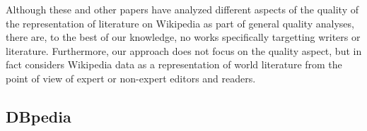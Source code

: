 \documentclass[a4paper,12pt]{scrartcl}
\begin{document}
Although these and %
other papers have analyzed different aspects of the quality of the
representation of literature on Wikipedia as part of
general %
quality analyses, there are, to the best of our knowledge, no works
specifically targetting writers or literature. Furthermore,
our approach does not focus on the quality aspect, but in fact
considers Wikipedia data as a representation of world literature
from the point of view of expert or non-expert editors and readers.



\subsection{DBpedia}\label{sec:dbpedia}
\end{document}
